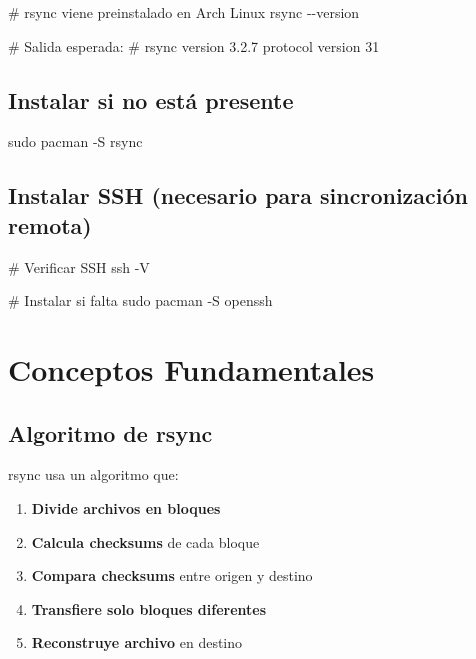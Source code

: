 \documentclass[
  doc,
  floatsintext,
  longtable,
  a4paper,
  nolmodern,
  notxfonts,
  notimes,
  12pt,
  colorlinks=true,linkcolor=blue,citecolor=blue,urlcolor=blue]{apa7}
\newenvironment{Shaded}{\begin{snugshade}}{\end{snugshade}}
\newcommand{\AttributeTok}[1]{\textcolor[rgb]{0.40,0.45,0.13}{#1}}
\newcommand{\CommentTok}[1]{\textcolor[rgb]{0.37,0.37,0.37}{#1}}
\newcommand{\FunctionTok}[1]{\textcolor[rgb]{0.28,0.35,0.67}{#1}}
\newcommand{\NormalTok}[1]{\textcolor[rgb]{0.00,0.23,0.31}{#1}}
\providecommand{\tightlist}{%
  \setlength{\itemsep}{0pt}\setlength{\parskip}{0pt}}
\begin{document}
\begin{Shaded}
\begin{Highlighting}[]
\CommentTok{\# rsync viene preinstalado en Arch Linux}
\FunctionTok{rsync} \AttributeTok{{-}{-}version}

\CommentTok{\# Salida esperada:}
\CommentTok{\# rsync  version 3.2.7  protocol version 31}
\end{Highlighting}
\end{Shaded}

\subsection{Instalar si no está
presente}\label{instalar-si-no-estuxe1-presente}

\begin{Shaded}
\begin{Highlighting}[]
\FunctionTok{sudo}\NormalTok{ pacman }\AttributeTok{{-}S}\NormalTok{ rsync}
\end{Highlighting}
\end{Shaded}

\subsection{Instalar SSH (necesario para sincronización
remota)}\label{instalar-ssh-necesario-para-sincronizaciuxf3n-remota}

\begin{Shaded}
\begin{Highlighting}[]
\CommentTok{\# Verificar SSH}
\FunctionTok{ssh} \AttributeTok{{-}V}

\CommentTok{\# Instalar si falta}
\FunctionTok{sudo}\NormalTok{ pacman }\AttributeTok{{-}S}\NormalTok{ openssh}
\end{Highlighting}
\end{Shaded}

\section{Conceptos Fundamentales}\label{conceptos-fundamentales}

\subsection{Algoritmo de rsync}\label{algoritmo-de-rsync}

rsync usa un algoritmo que:

\begin{enumerate}
\def\labelenumi{\arabic{enumi}.}
\tightlist
\item
  \textbf{Divide archivos en bloques}
\item
  \textbf{Calcula checksums} de cada bloque
\item
  \textbf{Compara checksums} entre origen y destino
\item
  \textbf{Transfiere solo bloques diferentes}
\item
  \textbf{Reconstruye archivo} en destino
\end{enumerate}
\end{document}
